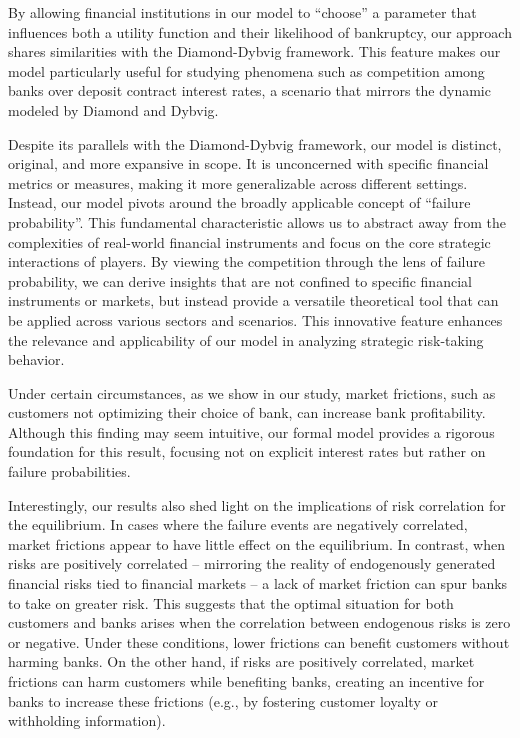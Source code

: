 \documentclass[preprint,12pt,authoryear]{elsarticle}
\theoremstyle{definition}
\begin{document}
By allowing financial institutions in our model to ``choose'' a parameter that influences both a utility function and their likelihood of bankruptcy, our approach shares similarities with the Diamond-Dybvig framework. This feature makes our model particularly useful for studying phenomena such as competition among banks over deposit contract interest rates, a scenario that mirrors the dynamic modeled by Diamond and Dybvig.

Despite its parallels with the Diamond-Dybvig framework, our model is distinct, original, and more expansive in scope. It is unconcerned with specific financial metrics or measures, making it more generalizable across different settings. Instead, our model pivots around the broadly applicable concept of ``failure probability''. This fundamental characteristic allows us to abstract away from the complexities of real-world financial instruments and focus on the core strategic interactions of players. By viewing the competition through the lens of failure probability, we can derive insights that are not confined to specific financial instruments or markets, but instead provide a versatile theoretical tool that can be applied across various sectors and scenarios. This innovative feature enhances the relevance and applicability of our model in analyzing strategic risk-taking behavior.

Under certain circumstances, as we show in our study, market frictions, such as customers not optimizing their choice of bank, can increase bank profitability. Although this finding may seem intuitive, our formal model provides a rigorous foundation for this result, focusing not on explicit interest rates but rather on failure probabilities.

Interestingly, our results also shed light on the implications of risk correlation for the equilibrium. In cases where the failure events are negatively correlated, market frictions appear to have little effect on the equilibrium. In contrast, when risks are positively correlated – mirroring the reality of endogenously generated financial risks tied to financial markets – a lack of market friction can spur banks to take on greater risk. This suggests that the optimal situation for both customers and banks arises when the correlation between endogenous risks is zero or negative. Under these conditions, lower frictions can benefit customers without harming banks. On the other hand, if risks are positively correlated, market frictions can harm customers while benefiting banks, creating an incentive for banks to increase these frictions (e.g., by fostering customer loyalty or withholding information).
\end{document}
